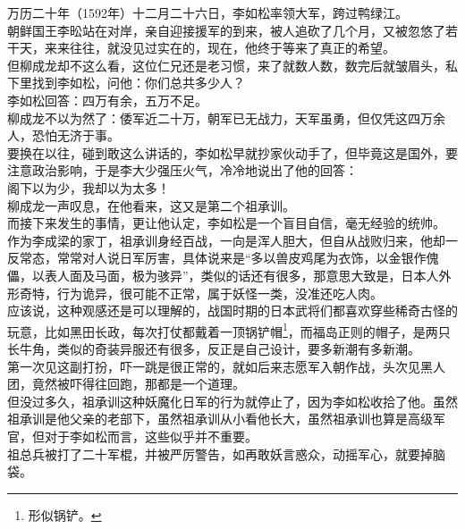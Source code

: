 \begin{multicols}{\theparacolNo}
万历二十年（1592年）十二月二十六日，李如松率领大军，跨过鸭绿江。\\

朝鲜国王李昖站在对岸，亲自迎接援军的到来，被人追砍了几个月，又被忽悠了若干天，来来往往，就没见过实在的，现在，他终于等来了真正的希望。\\

但柳成龙却不这么看，这位仁兄还是老习惯，来了就数人数，数完后就皱眉头，私下里找到李如松，问他：你们总共多少人？\\

李如松回答：四万有余，五万不足。\\

柳成龙不以为然了：倭军近二十万，朝军已无战力，天军虽勇，但仅凭这四万余人，恐怕无济于事。\\

要换在以往，碰到敢这么讲话的，李如松早就抄家伙动手了，但毕竟这是国外，要注意政治影响，于是李大少强压火气，冷冷地说出了他的回答：\\

阁下以为少，我却以为太多！\\

柳成龙一声叹息，在他看来，这又是第二个祖承训。\\

而接下来发生的事情，更让他认定，李如松是一个盲目自信，毫无经验的统帅。\\

作为李成梁的家丁，祖承训身经百战，一向是浑人胆大，但自从战败归来，他却一反常态，常常对人说日军厉害，具体说来是“多以兽皮鸡尾为衣饰，以金银作傀儡，以表人面及马面，极为骇异”，类似的话还有很多，那意思大致是，日本人外形奇特，行为诡异，很可能不正常，属于妖怪一类，没准还吃人肉。\\

应该说，这种观感还是可以理解的，战国时期的日本武将们都喜欢穿些稀奇古怪的玩意，比如黑田长政，每次打仗都戴着一顶锅铲帽\footnote{形似锅铲。}，而福岛正则的帽子，是两只长牛角，类似的奇装异服还有很多，反正是自己设计，要多新潮有多新潮。\\

第一次见这副打扮，吓一跳是很正常的，就如后来志愿军入朝作战，头次见黑人团，竟然被吓得往回跑，那都是一个道理。\\

但没过多久，祖承训这种妖魔化日军的行为就停止了，因为李如松收拾了他。虽然祖承训是他父亲的老部下，虽然祖承训从小看他长大，虽然祖承训也算是高级军官，但对于李如松而言，这些似乎并不重要。\\

祖总兵被打了二十军棍，并被严厉警告，如再敢妖言惑众，动摇军心，就要掉脑袋。\\


\end{multicols}
